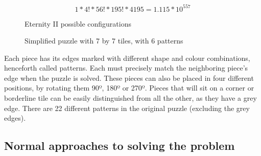 \documentclass{llncs}
\begin{document}
\begin{figure}[H]
  \begin{equation}
  1 * 4! * 56! * 195! * 4195 = 1.115 * 10 ^{557}
  \end{equation}
  \caption{Eternity II possible configurations}
  \label{fig:eq:eternity2combinations}
\end{figure}

\begin{figure}[H]
  \centering
  \hspace{5mm}
  \caption{Simplified puzzle with 7 by 7 tiles, with 6 patterns}
  \label{fig:7x7_example}
\end{figure}

Each piece has its edges marked with different shape and colour combinations, henceforth called patterns. Each must precisely match the neighboring piece's edge when the puzzle is solved. These pieces can also be placed in four different positions, by rotating them 90º, 180º or 270º. Pieces that will sit on a corner or borderline tile can be easily distinguished from all the other, as they have a grey edge. There are 22 different patterns in the original puzzle (excluding the grey edges).

\subsection{Normal approaches to solving the problem}\label{sec:normal_approaches}
\end{document}
